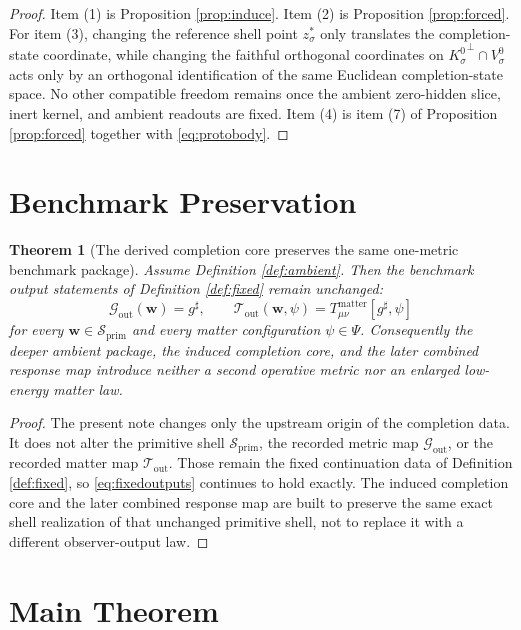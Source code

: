 \documentclass[11pt]{article}
\newcommand{\CompletedMetric}{g^{\sharp}}
\newcommand{\PrimShell}{\mathcal S_{\mathrm{prim}}}
\newcommand{\MetricOut}{\mathscr G_{\mathrm{out}}}
\newcommand{\MatterOut}{\mathscr T_{\mathrm{out}}}
\newcommand{\ZeroHiddenVec}[1]{V_{#1}^{0}}
\newcommand{\Kernel}[1]{K_{#1}^{0}}
\newcommand{\ReferencePoint}[1]{z_{#1}^{\ast}}
\newtheorem{theorem}{Theorem}
\begin{document}
\begin{proof}
Item (1) is Proposition \ref{prop:induce}. Item (2) is Proposition \ref{prop:forced}. For item (3), changing the reference shell point \(\ReferencePoint{\sigma}\) only translates the completion-state coordinate, while changing the faithful orthogonal coordinates on \({\Kernel{\sigma}}^{\perp}\cap\ZeroHiddenVec{\sigma}\) acts only by an orthogonal identification of the same Euclidean completion-state space. No other compatible freedom remains once the ambient zero-hidden slice, inert kernel, and ambient readouts are fixed. Item (4) is item (7) of Proposition \ref{prop:forced} together with \eqref{eq:protobody}.
\end{proof}

\section{Benchmark Preservation}

\begin{theorem}[The derived completion core preserves the same one-metric benchmark package]
\label{thm:outputs}
Assume Definition \ref{def:ambient}. Then the benchmark output statements of Definition \ref{def:fixed} remain unchanged:
\[
\MetricOut(\mathbf w)=\CompletedMetric,
\qquad
\MatterOut(\mathbf w,\psi)
=
T_{\mu\nu}^{\mathrm{matter}}[\CompletedMetric,\psi]
\]
for every \(\mathbf w\in\PrimShell\) and every matter configuration \(\psi\in\Psi\). Consequently the deeper ambient package, the induced completion core, and the later combined response map introduce neither a second operative metric nor an enlarged low-energy matter law.
\end{theorem}

\begin{proof}
The present note changes only the upstream origin of the completion data. It does not alter the primitive shell \(\PrimShell\), the recorded metric map \(\MetricOut\), or the recorded matter map \(\MatterOut\). Those remain the fixed continuation data of Definition \ref{def:fixed}, so \eqref{eq:fixedoutputs} continues to hold exactly. The induced completion core and the later combined response map are built to preserve the same exact shell realization of that unchanged primitive shell, not to replace it with a different observer-output law.
\end{proof}

\section{Main Theorem}
\end{document}
